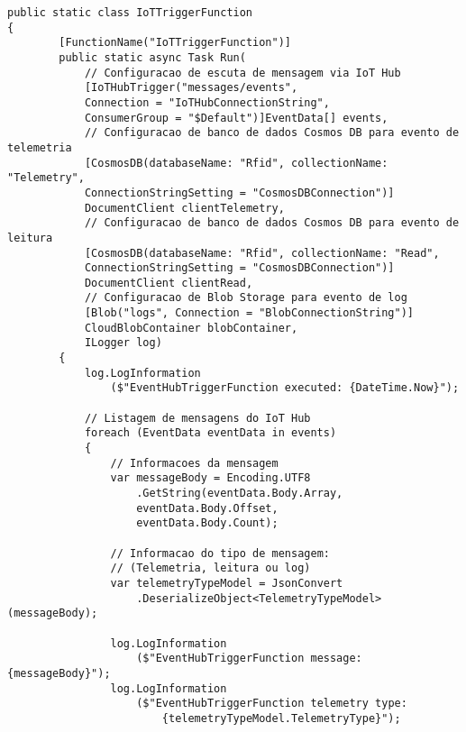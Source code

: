 \begin{lstlisting}[language={[Sharp]C}, label=azure-functions]
public static class IoTTriggerFunction
{
        [FunctionName("IoTTriggerFunction")]
        public static async Task Run(
            // Configuracao de escuta de mensagem via IoT Hub
            [IoTHubTrigger("messages/events",
            Connection = "IoTHubConnectionString",
            ConsumerGroup = "$Default")]EventData[] events,
            // Configuracao de banco de dados Cosmos DB para evento de telemetria
            [CosmosDB(databaseName: "Rfid", collectionName: "Telemetry",
            ConnectionStringSetting = "CosmosDBConnection")]
            DocumentClient clientTelemetry,
            // Configuracao de banco de dados Cosmos DB para evento de leitura
            [CosmosDB(databaseName: "Rfid", collectionName: "Read",
            ConnectionStringSetting = "CosmosDBConnection")]
            DocumentClient clientRead,
            // Configuracao de Blob Storage para evento de log
            [Blob("logs", Connection = "BlobConnectionString")]
            CloudBlobContainer blobContainer,
            ILogger log)
        {
            log.LogInformation
                ($"EventHubTriggerFunction executed: {DateTime.Now}");

            // Listagem de mensagens do IoT Hub
            foreach (EventData eventData in events)
            {
                // Informacoes da mensagem
                var messageBody = Encoding.UTF8
                    .GetString(eventData.Body.Array,
                    eventData.Body.Offset,
                    eventData.Body.Count);
                    
                // Informacao do tipo de mensagem:
                // (Telemetria, leitura ou log)
                var telemetryTypeModel = JsonConvert
                    .DeserializeObject<TelemetryTypeModel>(messageBody);

                log.LogInformation
                    ($"EventHubTriggerFunction message: {messageBody}");
                log.LogInformation
                    ($"EventHubTriggerFunction telemetry type:
                        {telemetryTypeModel.TelemetryType}");


\end{lstlisting}
